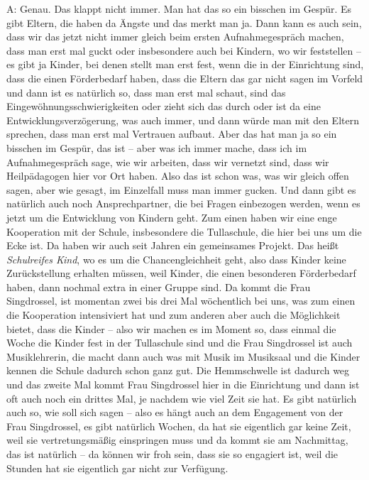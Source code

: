 A: Genau. Das klappt nicht immer. Man hat das so ein bisschen im Gespür. Es gibt Eltern, die haben da Ängste und das merkt man ja. Dann kann es auch sein, dass wir das jetzt nicht immer gleich beim ersten Aufnahmegespräch machen, dass man erst mal guckt oder insbesondere auch bei Kindern, wo wir feststellen -- es gibt ja Kinder, bei denen stellt man erst fest, wenn die in der Einrichtung sind, dass die einen Förderbedarf haben, dass die Eltern das gar nicht sagen im Vorfeld und dann ist es natürlich so, dass man erst mal schaut, sind das Eingewöhnungsschwierigkeiten oder zieht sich das durch oder ist da eine Entwicklungsverzögerung, was auch immer, und dann würde man mit den Eltern sprechen, dass man erst mal Vertrauen aufbaut. Aber das hat man ja so ein bisschen im Gespür, das ist -- aber was ich immer mache, dass ich im Aufnahmegespräch sage, wie wir arbeiten, dass wir vernetzt sind, dass wir Heilpädagogen hier vor Ort haben. Also das ist schon was, was wir gleich offen sagen, aber wie gesagt, im Einzelfall muss man immer gucken.      
Und dann gibt es natürlich auch noch Ansprechpartner, die bei Fragen einbezogen werden, wenn es jetzt um die Entwicklung von Kindern geht. Zum einen haben wir eine enge Kooperation mit der Schule, insbesondere die Tullaschule, die hier bei uns um die Ecke ist. Da haben wir auch seit Jahren ein gemeinsames Projekt. Das heißt \emph{Schulreifes Kind}, wo es um die Chancengleichheit geht, also dass Kinder keine Zurückstellung erhalten müssen, weil Kinder, die einen besonderen Förderbedarf haben, dann nochmal extra in einer Gruppe sind. Da kommt die Frau Singdrossel, ist momentan zwei bis drei Mal wöchentlich bei uns, was zum einen die Kooperation intensiviert hat und zum anderen aber auch die Möglichkeit bietet, dass die Kinder -- also wir machen es im Moment so, dass einmal die Woche die Kinder fest in der Tullaschule sind und die Frau Singdrossel ist auch Musiklehrerin, die macht dann auch was mit Musik im Musiksaal und die Kinder kennen die Schule dadurch schon ganz gut. Die Hemmschwelle ist dadurch weg und das zweite Mal kommt Frau Singdrossel hier in die Einrichtung und dann ist oft auch noch ein drittes Mal, je nachdem wie viel Zeit sie hat. Es gibt natürlich auch so, wie soll sich sagen -- also es hängt auch an dem Engagement von der Frau Singdrossel, es gibt natürlich Wochen, da hat sie eigentlich gar keine Zeit, weil sie vertretungsmäßig einspringen muss und da kommt sie am Nachmittag, das ist natürlich -- da können wir froh sein, dass sie so engagiert ist, weil die Stunden hat sie eigentlich gar nicht zur Verfügung. 


